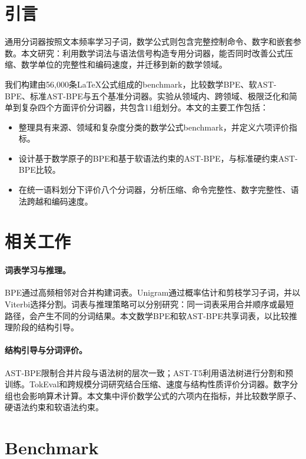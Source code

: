 \section{引言}
通用分词器按照文本频率学习子词，数学公式则包含完整控制命令、数字和嵌套参数。本文研究：利用数学词法与语法信号构造专用分词器，能否同时改善公式压缩、数学单位的完整性和编码速度，并迁移到新的数学领域。

我们构建由56,000条LaTeX公式组成的benchmark，比较数学BPE、软AST-BPE、标准AST-BPE与五个基准分词器。实验从领域内、跨领域、极限泛化和简单到复杂四个方面评价分词器，共包含11组划分。本文的主要工作包括：
\begin{itemize}
\item 整理具有来源、领域和复杂度分类的数学公式benchmark，并定义六项评价指标。
\item 设计基于数学原子的BPE和基于软语法约束的AST-BPE，与标准硬约束AST-BPE比较。
\item 在统一语料划分下评价八个分词器，分析压缩、命令完整性、数字完整性、语法跨越和编码速度。
\end{itemize}

\section{相关工作}
\paragraph{词表学习与推理。}
BPE通过高频相邻对合并构建词表\citep{sennrich-etal-2016-neural}。Unigram通过概率估计和剪枝学习子词，并以Viterbi选择分割\citep{kudo-2018-subword,kudo-richardson-2018-sentencepiece}。词表与推理策略可以分别研究：同一词表采用合并顺序或最短路径，会产生不同的分词结果\citep{uzan-etal-2024-greed,schmidt-etal-2024-tokenization}。本文数学BPE和软AST-BPE共享词表，以比较推理阶段的结构引导。

\paragraph{结构引导与分词评价。}
AST-BPE限制合并片段与语法树的层次一致\citep{muller2019ast}；AST-T5利用语法树进行分割和预训练\citep{gong2024ast}。TokEval和跨规模分词研究结合压缩、速度与结构性质评价分词器\citep{meister2026tokeval,lotz-etal-2025-beyond}。数字分组也会影响算术计算\citep{singh2024counts}。本文集中评价数学公式的六项内在指标，并比较数学原子、硬语法约束和软语法约束。

\section{Benchmark}

